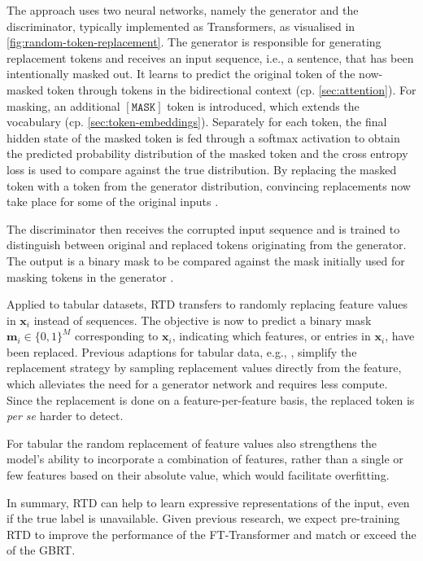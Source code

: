 The approach uses two neural networks, namely the generator and the discriminator, typically implemented as Transformers, as visualised in \cref{fig:random-token-replacement}.  The generator is responsible for generating replacement tokens and receives an input sequence, i.e., a sentence, that has been intentionally masked out. It learns to predict the original token of the now-masked token through tokens in the bidirectional context (cp. \cref{sec:attention}). For masking, an additional $\mathtt{[MASK]}$ token is introduced, which extends the vocabulary (cp. \cref{sec:token-embeddings}). Separately for each token, the final hidden state of the masked token is fed through a softmax activation to obtain the predicted probability distribution of the masked token and the cross entropy loss is used to compare against the true distribution. By replacing the masked token with a token from the generator distribution, convincing replacements now take place for some of the original inputs \autocite[][2--3]{clarkElectraPretrainingText2020}.

The discriminator then receives the corrupted input sequence and is trained to distinguish between original and replaced tokens originating from the generator. The output is a binary mask to be compared against the mask initially used for masking tokens in the generator \autocite[][2--3]{clarkElectraPretrainingText2020}.

Applied to tabular datasets, \gls{RTD} transfers to randomly replacing feature values in $\mathbf{x}_{i}$ instead of sequences. The objective is now to predict a binary mask $\mathbf{m}_{i}\in \{0,1\}^{M}$ corresponding to $\mathbf{x}_{i}$, indicating which features, or entries in $\mathbf{x}_{i}$, have been replaced. Previous adaptions for tabular data, e.g., \textcite[][3]{huangTabTransformerTabularData2020}, simplify the replacement strategy by sampling replacement values directly from the feature, which alleviates the need for a generator network and requires less compute. Since the replacement is done on a feature-per-feature basis, the replaced token is \emph{per se} harder to detect.

For tabular the random replacement of feature values also strengthens the model's ability to incorporate a combination of features, rather than a single or few features based on their absolute value, which would facilitate overfitting.

In summary, \gls{RTD} can help to learn expressive representations of the input, even if the true label is unavailable. Given previous research, we expect pre-training \gls{RTD} to improve the performance of the FT-Transformer and match or exceed the of the \gls{GBRT}.